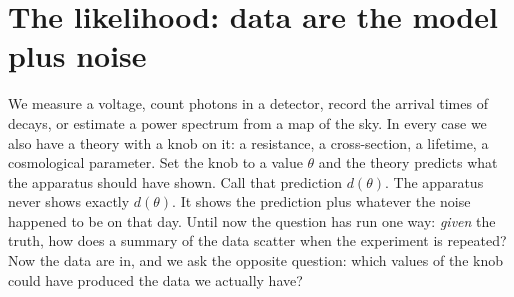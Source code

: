 \providecommand{\ThreeBRBRBVar}{}\renewcommand{\ThreeBRBRBVar}{0.00799}
\providecommand{\ThreeBRBRatio}{}\renewcommand{\ThreeBRBRatio}{0.04608}
\providecommand{\ThreeBRBCR}{}\renewcommand{\ThreeBRBCR}{0.007468}
\providecommand{\ThreeBRBCrudeVarTh}{}\renewcommand{\ThreeBRBCrudeVarTh}{0.1733}
\providecommand{\ThreeBRBRBVarTh}{}\renewcommand{\ThreeBRBRBVarTh}{0.008057}
\providecommand{\ThreeBRBn}{}\renewcommand{\ThreeBRBn}{10}
\providecommand{\ThreeBRBlam}{}\renewcommand{\ThreeBRBlam}{1.5}
\providecommand{\ThreeBBayesSqArg}{}\renewcommand{\ThreeBBayesSqArg}{3.005}
\providecommand{\ThreeBBayesAbsArg}{}\renewcommand{\ThreeBBayesAbsArg}{2.677}
\providecommand{\ThreeBBayesZOArg}{}\renewcommand{\ThreeBBayesZOArg}{2}
\providecommand{\ThreeBBayesMean}{}\renewcommand{\ThreeBBayesMean}{3}
\providecommand{\ThreeBBayesMedian}{}\renewcommand{\ThreeBBayesMedian}{2.672}
\providecommand{\ThreeBBayesMode}{}\renewcommand{\ThreeBBayesMode}{2}
\providecommand{\ThreeBCMBMeanTwo}{}\renewcommand{\ThreeBCMBMeanTwo}{0.9962}
\providecommand{\ThreeBCMBVarTwo}{}\renewcommand{\ThreeBCMBVarTwo}{0.401}
\providecommand{\ThreeBCMBBoundTwo}{}\renewcommand{\ThreeBCMBBoundTwo}{0.4}
\providecommand{\ThreeBCMBRelErrTwo}{}\renewcommand{\ThreeBCMBRelErrTwo}{0.6332}
\providecommand{\ThreeBCMBMeanThirty}{}\renewcommand{\ThreeBCMBMeanThirty}{1.002}
\providecommand{\ThreeBCMBVarThirty}{}\renewcommand{\ThreeBCMBVarThirty}{0.03236}
\providecommand{\ThreeBCMBBoundThirty}{}\renewcommand{\ThreeBCMBBoundThirty}{0.03279}
\providecommand{\ThreeBCMBRelErrThirty}{}\renewcommand{\ThreeBCMBRelErrThirty}{0.1799}
\providecommand{\ThreeBCMBScoreVarThirty}{}\renewcommand{\ThreeBCMBScoreVarThirty}{30.16}
\providecommand{\ThreeBCMBFishThirty}{}\renewcommand{\ThreeBCMBFishThirty}{30.5}
\providecommand{\ThreeBCMBScoreMeanThirty}{}\renewcommand{\ThreeBCMBScoreMeanThirty}{0.008949}
 
\section{The likelihood: data are the model plus noise}
\label{3b:sec:likelihood}

We measure a voltage, count photons in a detector, record the arrival
times of decays, or estimate a power spectrum from a map of the sky. In every
case we also have a theory with a knob on it: a resistance, a cross-section,
a lifetime, a cosmological parameter. Set the knob to a value $\theta$ and
the theory predicts what the apparatus should have shown. Call that
prediction $d(\theta)$. The apparatus never shows exactly $d(\theta)$. It
shows the prediction plus whatever the noise happened to be on that day.
Until now the question has run one way: \emph{given} the truth, how does a
summary of the data scatter when the experiment is repeated? Now the data
are in, and we ask the opposite question: which values of the knob could
have produced the data we actually have?

